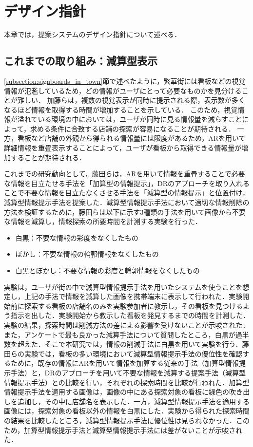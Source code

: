 \chapter{デザイン指針}
\label{chapter:design_guidline}
本章では，提案システムのデザイン指針について述べる．

\section{これまでの取り組み：減算型表示}
\label{section:dr_method}
  \ref{subsection:signboards_in_town}節で述べたように，繁華街には看板などの視覚情報が氾濫しているため，どの情報がユーザにとって必要なものかを見分けることが難しい．
  加藤らは，複数の視覚表示が同時に提示される際，表示数が多くなるほど情報を取得する時間が増加することを示している\cite{Kato:2008}．
  このため，視覚情報が溢れている環境の中においては，ユーザが同時に見る情報量を減らすことによって，求める条件に合致する店舗の探索が容易になることが期待される．
  一方，看板など店舗の外観から得られる情報量には限度があるため，ARを用いて詳細情報を重畳表示することによって，ユーザが看板から取得できる情報量が増加することが期待される．

  これまでの研究動向として，藤田らは，ARを用いて情報を重畳することで必要な情報を目立たせる手法を「加算型の情報提示」，DRのアプローチを取り入れることで不要な情報を目立たなくさせる手法を「減算型の情報提示」と位置付け，減算型情報提示手法を提案した\cite{Fujita:2013}．減算型情報提示手法において適切な情報削除の方法を検証するために，藤田らは以下に示す3種類の手法を用いて画像から不要な情報を減算し，情報探索の所要時間を計測する実験を行った．
  \begin{itemize}
    \item 白黒：不要な情報の彩度をなくしたもの
    \item ぼかし：不要な情報の輪郭情報をなくしたもの
    \item 白黒とぼかし：不要な情報の彩度と輪郭情報をなくしたもの
  \end{itemize}
  実験は，ユーザが街の中で減算型情報提示手法を用いたシステムを使うことを想定し，上記の手法で情報を減算した画像を携帯端末に表示して行われた．実験開始前に探索する看板の店舗名のみを実験参加者に教示し，その看板を見つけるよう指示を出した．実験開始から教示した看板を発見するまでの時間を計測した．実験の結果，探索時間は削減方法の差による影響を受けないことが示唆された．また，アンケートで最も良かった減算手法について質問したところ，白黒が過半数を超えた．そこで本研究では，情報の削減手法に白黒を用いて実験を行う．藤田らの実験では，看板の多い環境において減算型情報提示手法の優位性を確認するために，既存の情報にARを用いて情報を加算する従来の手法（加算型情報提示手法）と，DRのアプローチを用いて不要な情報を減算する提案手法（減算型情報提示手法）との比較を行い，それぞれの探索時間を比較が行われた．加算型情報提示手法を適用する画像は，画像の中にある探索対象の看板に緑色の吹き出しを追加し，その中に店舗名を表示した．一方，減算型情報提示手法を適用する画像には，探索対象の看板以外の情報を白黒にした．実験から得られた探索時間の結果を比較したところ，減算型情報提示手法に優位性は見られなかった．このため，加算型情報提示手法と減算型情報提示手法には差がないことが示唆された．

